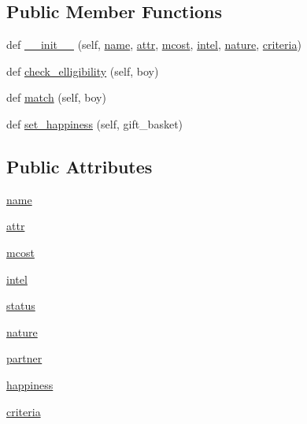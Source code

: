 \subsection*{Public Member Functions}
\begin{DoxyCompactItemize}
\item 
def \hyperlink{classgirls_1_1girl__uninherited_1_1_girl_a3baf6cbbda021313abf57a4b2d2e9efa}{\+\_\+\+\_\+init\+\_\+\+\_\+} (self, \hyperlink{classgirls_1_1girl__uninherited_1_1_girl_a17de9450938ef15ad772de7a1acfc197}{name}, \hyperlink{classgirls_1_1girl__uninherited_1_1_girl_a3f915cb51744e34e3d2f88624b402148}{attr}, \hyperlink{classgirls_1_1girl__uninherited_1_1_girl_a6a34ca1b5efd14cc0c70e2a0bd0202dc}{mcost}, \hyperlink{classgirls_1_1girl__uninherited_1_1_girl_a820d0a86b6f84b7d3fc75d142cdedfdc}{intel}, \hyperlink{classgirls_1_1girl__uninherited_1_1_girl_af4b8bfdd9e572a69ce4f5bd047fe4aad}{nature}, \hyperlink{classgirls_1_1girl__uninherited_1_1_girl_a35076aa934b12cc39ae778cf0bb176c9}{criteria})
\item 
def \hyperlink{classgirls_1_1girl__uninherited_1_1_girl_a0fd44810c87eaef7df92c264d5b8f864}{check\+\_\+elligibility} (self, boy)
\item 
def \hyperlink{classgirls_1_1girl__uninherited_1_1_girl_ad587e7008df86ba455a660b464ff5d04}{match} (self, boy)
\item 
def \hyperlink{classgirls_1_1girl__uninherited_1_1_girl_adcb224d694d3995643f9daed685bd6dd}{set\+\_\+happiness} (self, gift\+\_\+basket)
\end{DoxyCompactItemize}
\subsection*{Public Attributes}
\begin{DoxyCompactItemize}
\item 
\hyperlink{classgirls_1_1girl__uninherited_1_1_girl_a17de9450938ef15ad772de7a1acfc197}{name}
\item 
\hyperlink{classgirls_1_1girl__uninherited_1_1_girl_a3f915cb51744e34e3d2f88624b402148}{attr}
\item 
\hyperlink{classgirls_1_1girl__uninherited_1_1_girl_a6a34ca1b5efd14cc0c70e2a0bd0202dc}{mcost}
\item 
\hyperlink{classgirls_1_1girl__uninherited_1_1_girl_a820d0a86b6f84b7d3fc75d142cdedfdc}{intel}
\item 
\hyperlink{classgirls_1_1girl__uninherited_1_1_girl_afe707a9b1349debe5d388105fdfa73c6}{status}
\item 
\hyperlink{classgirls_1_1girl__uninherited_1_1_girl_af4b8bfdd9e572a69ce4f5bd047fe4aad}{nature}
\item 
\hyperlink{classgirls_1_1girl__uninherited_1_1_girl_ab24240732eeb6eff5749572e45cb9b97}{partner}
\item 
\hyperlink{classgirls_1_1girl__uninherited_1_1_girl_a41b3e929e26dd04da47f42022436afd4}{happiness}
\item 
\hyperlink{classgirls_1_1girl__uninherited_1_1_girl_a35076aa934b12cc39ae778cf0bb176c9}{criteria}
\end{DoxyCompactItemize}


